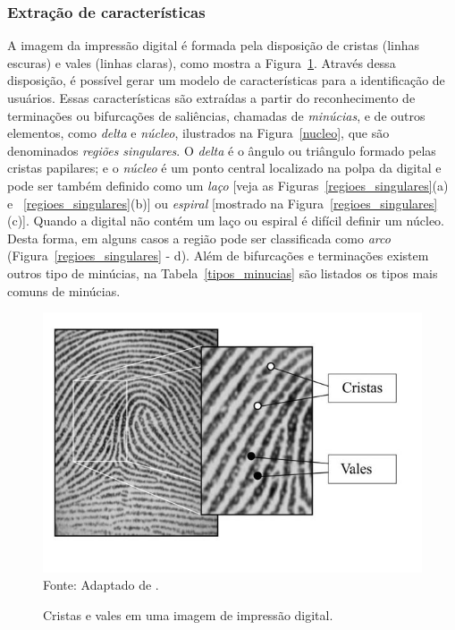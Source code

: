 \subsubsection{Extração de características}
  A imagem da impressão digital é formada pela disposição de cristas (linhas escuras) e vales (linhas claras), como mostra a Figura~\ref{cristas_vales}. Através dessa disposição, é possível gerar um modelo de características para a identificação de usuários. Essas características são extraídas a partir do reconhecimento de terminações ou bifurcações de saliências, chamadas de \textit{minúcias}, e de outros elementos, como \textit{delta} e \textit{núcleo}, ilustrados na Figura~\ref{nucleo}, que são denominados \textit{regiões singulares}. O \textit{delta} é o ângulo ou triângulo formado pelas cristas papilares; e o \textit{núcleo} é um ponto central localizado na polpa da digital e pode ser também definido como um \textit{laço} [veja as Figuras~\ref{regioes_singulares}(a) e ~\ref{regioes_singulares}(b)] ou \textit{espiral} [mostrado na Figura~\ref{regioes_singulares}(c)]. Quando a digital não contém um laço ou espiral é difícil definir um núcleo. Desta forma, em alguns casos a região pode ser classificada como \textit{arco} (Figura~\ref{regioes_singulares} - d).  Além de bifurcações e terminações existem outros tipo de minúcias, na Tabela~\ref{tipos_minucias} são listados os tipos mais comuns de minúcias.



  \begin{figure}[!ht]
  \begin{center}
  \caption{Cristas e vales em uma imagem de impressão digital.}
  \includegraphics[scale=0.6]{figuras/cap2/cristas_vales.jpg}\\
  Fonte: Adaptado de \cite{maltoni2009handbook}.
  \label{cristas_vales}
  \end{center}
  \end{figure}
  
